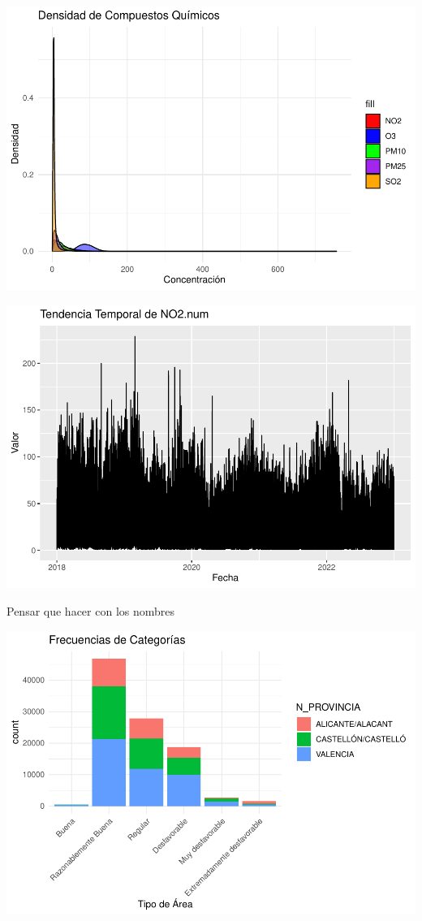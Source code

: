 \documentclass[notspecified,article,submit,moreauthors,pdftex]{Definitions/mdpi}
\begin{document}
\includegraphics{ProyectoAED2023_files/figure-latex/unnamed-chunk-26-1.pdf}

\includegraphics{ProyectoAED2023_files/figure-latex/unnamed-chunk-27-1.pdf}

Pensar que hacer con los nombres

\includegraphics{ProyectoAED2023_files/figure-latex/unnamed-chunk-28-1.pdf}
\end{document}
